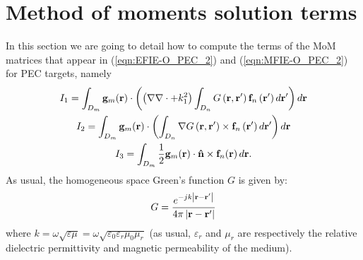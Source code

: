 \chapter{Method of moments solution terms}
\label{annex:MoM}

%
\par
In this section we are going to detail how to compute the terms of the MoM matrices that appear in (\ref{eqn:EFIE-O_PEC_2}) and (\ref{eqn:MFIE-O_PEC_2}) for PEC targets, namely
\begin{gather} 
I_1 = \int_{D_m}\mathbf{g}_m \!\left(\mathbf{r}\right) \cdot \left( \left(\nabla \nabla \cdot + k_1^2\right) \int_{D_n} G\left(\mathbf{r}, \mathbf{r}'\right) \mathbf{f}_n\left(\mathbf{r}'\right) d\mathbf{r}' \right) d\mathbf{r} \label{eqn:MoM terms I_1}\\
I_2 = \int_{D_m} \mathbf{g}_m \!\left(\mathbf{r}\right) \cdot \left(\int_{D_n} \nabla G\left(\mathbf{r}, \mathbf{r}'\right) \times \mathbf{f}_n\left(\mathbf{r}'\right) d\mathbf{r}'\right) d\mathbf{r} \label{eqn:MoM terms I_2}\\
I_3 = \int_{D_m} \frac{1}{2} \mathbf{g}_m \!\left(\mathbf{r}\right) \cdot \mathbf{\hat{n}} \times \mathbf{f}_{n}\!\left(\mathbf{r}\right)d\mathbf{r}. \label{eqn:MoM terms I_3}
\end{gather}
As usual, the homogeneous space Green's function $G$ is given by:
\begin{equation*}
G = \frac{e^{-jk\left|\mathbf{r}-\mathbf{r}' \right|}}{4 \pi \left|\mathbf{r}-\mathbf{r}' \right|}
\end{equation*}
where $k = \omega \sqrt{\varepsilon \mu} = \omega \sqrt{\varepsilon_0 \varepsilon_r \mu_0 \mu_r}$ (as usual, $\varepsilon_r$ and $\mu_r$ are respectively the relative dielectric permittivity and magnetic permeability of the medium).

